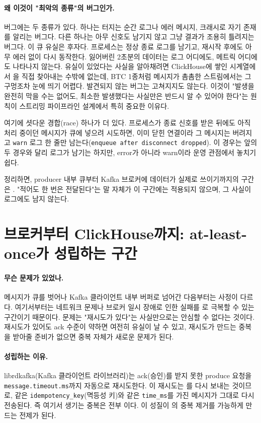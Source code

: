 \paragraph{왜 이것이 "최악의 종류"의 버그인가.} 버그에는 두 종류가 있다. 하나는
터지는 순간 로그나 에러 메시지, 크래시로 자기 존재를 알리는 버그다. 다른 하나는
아무 신호도 남기지 않고 그냥 결과가 조용히 틀려지는 버그다. 이 큐 유실은 후자다.
프로세스는 정상 종료 로그를 남기고, 재시작 후에도 아무 에러 없이 다시 동작한다.
잃어버린 2초분의 데이터는 로그 어디에도, 메트릭 어디에도 나타나지 않는다. 유실이
있었다는 사실을 알아채려면 ClickHouse에 쌓인 시계열에서 을 직접
찾아내는 수밖에 없는데, BTC 1종처럼 메시지가 촘촘한 스트림에서는 그 구멍조차
눈에 띄기 어렵다. 발견되지 않는 버그는 고쳐지지도 않는다. 이것이 "발생을 완전히
막을 수는 없어도, 최소한 발생했다는 사실만은 반드시 알 수 있어야 한다"는 원칙이
스트리밍 파이프라인 설계에서 특히 중요한 이유다.

여기에 셧다운 경합(race) 하나가 더 있다. 프로세스가 종료 신호를 받은 뒤에도 아직
처리 중이던 메시지가 큐에 넣으려 시도하면, 이미 닫힌 연결이라 그 메시지는 버려지고
\texttt{warn} 로그 한 줄만 남는다(\texttt{enqueue after disconnect dropped}). 이
경우는 앞의 두 경우와 달리 로그가 남기는 하지만, error가 아니라 warn이라 운영
관점에서 놓치기 쉽다.

정리하면, producer 내부 큐부터 Kafka 브로커에 데이터가 실제로 쓰이기까지의 구간은
. "적어도 한 번은 전달된다"는 말 자체가
이 구간에는 적용되지 않으며, 그 사실이 로그에도 남지 않는다.

\section{브로커부터 ClickHouse까지: at-least-once가 성립하는 구간}
\label{sec:delivery-atleastonce}

\paragraph{무슨 문제가 있었나.} 메시지가 큐를 벗어나 Kafka 클라이언트 내부 버퍼로
넘어간 다음부터는 사정이 다르다. 여기서부터는 네트워크 문제나 브로커 일시 장애로
인한 실패를 로 극복할 수 있는 구간이기 때문이다. 문제는 "재시도가
있다"는 사실만으로는 안심할 수 없다는 것이다. 재시도가 있어도 ack 수준이 약하면
여전히 유실이 날 수 있고, 재시도가 만드는 중복을 받아줄 준비가 없으면 중복 자체가
새로운 문제가 된다.

\paragraph{성립하는 이유.} librdkafka(Kafka 클라이언트 라이브러리)는 ack(승인)를 받지
못한 produce 요청을 \texttt{message.timeout.ms}까지 자동으로 재시도한다. 이 재시도는
를 다시 보내는 것이므로, 같은 \texttt{idempotency\_key}(멱등성 키)와
같은 \texttt{time\_ms}를 가진 메시지가 그대로 다시 전송된다. 즉 여기서 생기는 중복은
전부 이다. 이 성질이 의 중복 제거를
가능하게 만드는 전제가 된다.

